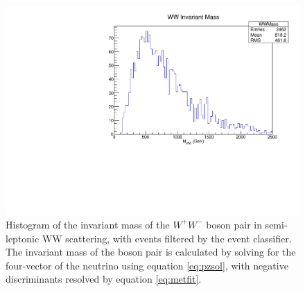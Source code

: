 \documentclass[10pt]{ucscthesisbs}
\begin{document}
\begin{figure}
\includegraphics[height=8cm]{images/SMWWSpectrum}
\caption{Histogram of the invariant mass of the $W^{+}W^{-}$ boson pair in semi-leptonic WW scattering, with events filtered by the event classifier. The invariant mass of the boson pair is calculated by solving for the four-vector of the neutrino using equation \ref{eq:pzsol}, with negative discriminants resolved by equation \ref{eq:metfit}.}
\label{fig:smwwspectrum}
\end{figure}
\end{document}
